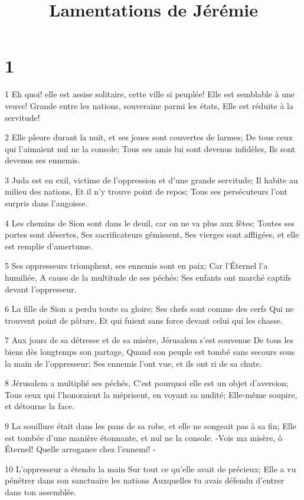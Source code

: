 

\title{Lamentations de Jérémie}


\chapter{1}

\par 1 Eh quoi! elle est assise solitaire, cette ville si peuplée! Elle est semblable à une veuve! Grande entre les nations, souveraine parmi les états, Elle est réduite à la servitude!
\par 2 Elle pleure durant la nuit, et ses joues sont couvertes de larmes; De tous ceux qui l'aimaient nul ne la console; Tous ses amis lui sont devenus infidèles, Ils sont devenus ses ennemis.
\par 3 Juda est en exil, victime de l'oppression et d'une grande servitude; Il habite au milieu des nations, Et il n'y trouve point de repos; Tous ses persécuteurs l'ont surpris dans l'angoisse.
\par 4 Les chemins de Sion sont dans le deuil, car on ne va plus aux fêtes; Toutes ses portes sont désertes, Ses sacrificateurs gémissent, Ses vierges sont affligées, et elle est remplie d'amertume.
\par 5 Ses oppresseurs triomphent, ses ennemis sont en paix; Car l'Éternel l'a humiliée, A cause de la multitude de ses péchés; Ses enfants ont marché captifs devant l'oppresseur.
\par 6 La fille de Sion a perdu toute sa gloire; Ses chefs sont comme des cerfs Qui ne trouvent point de pâture, Et qui fuient sans force devant celui qui les chasse.
\par 7 Aux jours de sa détresse et de sa misère, Jérusalem s'est souvenue De tous les biens dès longtemps son partage, Quand son peuple est tombé sans secours sous la main de l'oppresseur; Ses ennemis l'ont vue, et ils ont ri de sa chute.
\par 8 Jérusalem a multiplié ses péchés, C'est pourquoi elle est un objet d'aversion; Tous ceux qui l'honoraient la méprisent, en voyant sa nudité; Elle-même soupire, et détourne la face.
\par 9 La souillure était dans les pans de sa robe, et elle ne songeait pas à sa fin; Elle est tombée d'une manière étonnante, et nul ne la console. -Vois ma misère, ô Éternel! Quelle arrogance chez l'ennemi! -
\par 10 L'oppresseur a étendu la main Sur tout ce qu'elle avait de précieux; Elle a vu pénétrer dans son sanctuaire les nations Auxquelles tu avais défendu d'entrer dans ton assemblée.
